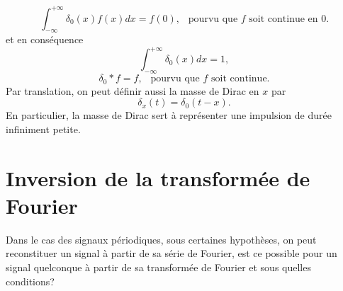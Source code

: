 \begin{equation} \label{eq:defdelta}
 \int_{-\infty}^{+\infty} \delta_0(x) f(x) dx = f(0), \ \ \mbox{ pourvu que } f \mbox{ soit continue en } 0. 
\end{equation}
et en conséquence
$$ \int_{-\infty}^{+\infty} \delta_0(x) dx = 1, $$
$$ \delta_0 * f = f, \ \ \mbox{ pourvu que } f \mbox{ soit continue}. $$
Par translation, on peut définir aussi la masse de Dirac en $x$ par
$$ \delta_x(t) = \delta_0(t-x). $$
En particulier, la masse de Dirac sert à représenter une impulsion de durée infiniment petite.




\section{Inversion de la transformée de Fourier}

Dans le cas des signaux périodiques, sous certaines hypothèses, on peut reconstituer un signal à partir de sa série de Fourier, est ce possible pour un signal quelconque à partir de sa transformée de Fourier et sous quelles conditions?
